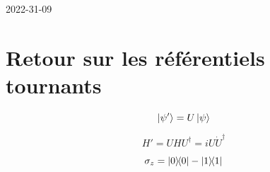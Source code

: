 


2022-31-09

\section*{Retour sur les référentiels tournants}

\[ \ket{\psi'} = U \ket{\psi}\] 

\[ H' = UHU^{\dagger} = i U\dot U^{\dagger} \] 


\[ \sigma_z = \op 0 - \op 1  \] 




